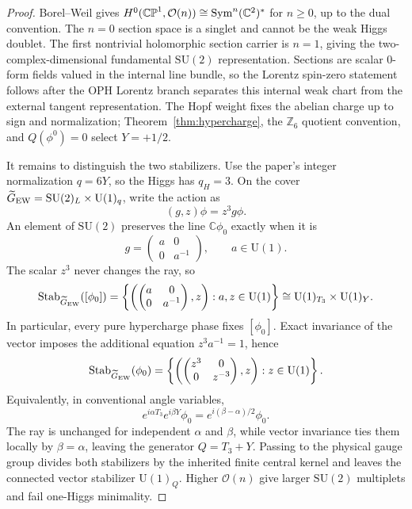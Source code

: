 \documentclass[11pt]{article}
\newcommand{\SU}{\mathrm{SU}}
\newcommand{\U}{\mathrm{U}}
\begin{document}
\begin{proof}
Borel--Weil gives \(H^0(\mathbb{CP}^1,\mathcal O(n))\cong{\rm Sym}^n(\mathbb C^2)^*\) for \(n\ge0\), up to the dual convention. The \(n=0\) section space is a singlet and cannot be the weak Higgs doublet. The first nontrivial holomorphic section carrier is \(n=1\), giving the two-complex-dimensional fundamental \(\SU(2)\) representation. Sections are scalar \(0\)-form fields valued in the internal line bundle, so the Lorentz spin-zero statement follows after the OPH Lorentz branch separates this internal weak chart from the external tangent representation. The Hopf weight fixes the abelian charge up to sign and normalization; Theorem~\ref{thm:hypercharge}, the \(\mathbb Z_6\) quotient convention, and \(Q(\phi^0)=0\) select \(Y=+1/2\).

It remains to distinguish the two stabilizers. Use the paper's integer normalization \(q=6Y\), so the Higgs has \(q_H=3\). On the cover \(\widetilde G_{\rm EW}=\SU(2)_L\times\U(1)_q\), write the action as
\[
(g,z)\phi=z^3g\phi.
\]
An element of \(\SU(2)\) preserves the line \(\mathbb C\phi_0\) exactly when it is
\[
g=\begin{pmatrix}a&0\\0&a^{-1}\end{pmatrix},
\qquad a\in\U(1).
\]
The scalar \(z^3\) never changes the ray, so
\[
\operatorname{Stab}_{\widetilde G_{\rm EW}}([\phi_0])
=
\left\{
\left(
\begin{pmatrix}a&0\\0&a^{-1}\end{pmatrix},z
\right):a,z\in\U(1)
\right\}
\cong\U(1)_{T_3}\times\U(1)_Y.
\]
In particular, every pure hypercharge phase fixes \([\phi_0]\). Exact invariance of the vector imposes the additional equation \(z^3a^{-1}=1\), hence
\[
\operatorname{Stab}_{\widetilde G_{\rm EW}}(\phi_0)
=
\left\{
\left(
\begin{pmatrix}z^3&0\\0&z^{-3}\end{pmatrix},z
\right):z\in\U(1)
\right\}.
\]
Equivalently, in conventional angle variables,
\[
e^{i\alpha T_3}e^{i\beta Y}\phi_0
=e^{i(\beta-\alpha)/2}\phi_0.
\]
The ray is unchanged for independent \(\alpha\) and \(\beta\), while vector invariance ties them locally by \(\beta=\alpha\), leaving the generator \(Q=T_3+Y\). Passing to the physical gauge group divides both stabilizers by the inherited finite central kernel and leaves the connected vector stabilizer \(\U(1)_Q\). Higher \(\mathcal O(n)\) give larger \(\SU(2)\) multiplets and fail one-Higgs minimality.
\end{proof}
\end{document}
